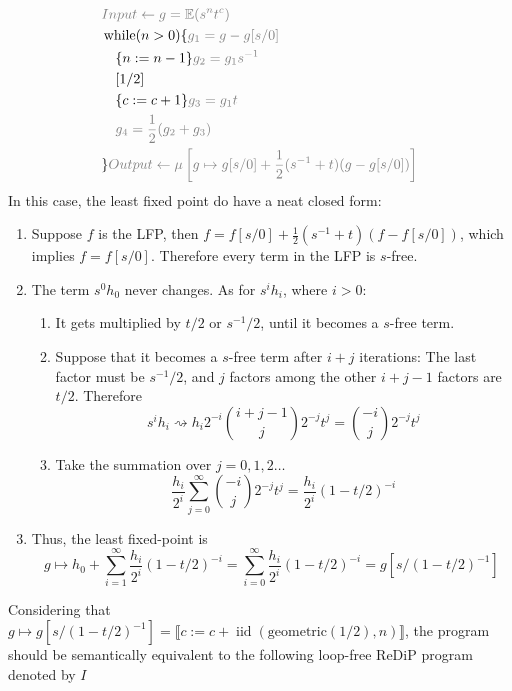 \documentclass[a4paper]{article}
\DeclareMathOperator*{\iid}{iid}
\renewcommand{\S}[1]{ \llbracket #1 \rrbracket }
\newcommand{\E}{ \mathbb{E} }
\newcommand{\Geom}{\mathrm{geometric}}
\newcommand{\Anno}[1]{\color{gray}{#1}}
\begin{document}
\begin{align*}
	 & \Anno{Input \gets g = \E(s^n t^c)}                                                          \\
	 & \operatorname{while} (n>0) \{  \Anno{g_1 = g - g[s/0] }                                     \\
	 & \quad \{ n := n - 1 \} \Anno{g_2 = g_1 s^{-1}}                                              \\
	 & \quad [1/2]                                                                                 \\
	 & \quad \{ c := c + 1 \} \Anno{g_3 = g_1 t}                                                   \\
	 & \quad \Anno{g_4 = \frac12 (g_2 + g_3)}                                                      \\
	 & \} \Anno{Output \gets \mu \left[ g \mapsto g[s/0] + \frac12(s^{-1} + t)(g-g[s/0]) \right] } \\
\end{align*}
In this case, the least fixed point do have a neat closed form:
\begin{enumerate}
	\item Suppose \(f\) is the LFP, then \( f = f[s/0] + \frac12(s^{-1} + t)(f-f[s/0]) \), which implies \(f = f[s/0]\). Therefore every term in the LFP is \(s\)-free.
	\item The term \(s^0 h_0\) never changes. As for \(s^i h_i\), where \(i>0\):
	      \begin{enumerate}
		      \item It gets multiplied by \(t/2\) or \(s^{-1}/2\), until it becomes a \(s\)-free term.
		      \item Suppose that it becomes a \(s\)-free term after \(i+j\) iterations:
		            The last factor must be \(s^{-1}/2\), and \(j\) factors among the other \(i+j-1\) factors are \(t/2\).
		            Therefore
		            \[
			            s^i h_i \rightsquigarrow h_i 2^{-i} \binom{i+j-1}{j} 2^{-j}t^j = \binom{-i}{j}2^{-j} t^j
		            \]
		      \item Take the summation over \(j=0,1,2\ldots\)
		            \[
			            \frac{h_i}{2^i} \sum_{j=0}^\infty \binom{-i}{j} 2^{-j}t^j
			            = \frac{h_i}{2^i} {(1-t/2)}^{-i}
		            \]
	      \end{enumerate}
	\item Thus, the least fixed-point is
	      \[
		      g\mapsto h_0 + \sum_{i=1}^\infty \frac{h_i}{2^i} {(1-t/2)}^{-i}
		      = \sum_{i=0}^\infty \frac{h_i}{2^i} {(1-t/2)}^{-i}
		      = g[s/{(1-t/2)}^{-1}]
	      \]
\end{enumerate}
Considering that \(g\mapsto g[s/{(1-t/2)}^{-1}] = \S{c := c + \iid(\Geom(1/2),n)}\),
the program should be semantically equivalent to the following loop-free ReDiP program denoted by \(I\)
\end{document}
